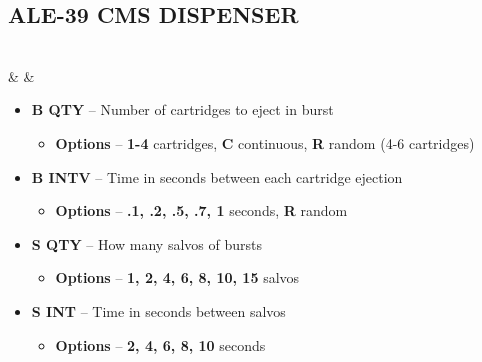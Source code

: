 \documentclass[fontInter]{TechCheck}
\begin{document}
	\subsection{ALE-39 CMS DISPENSER}
	\begin{listlongtable}
		 \\
		\midrule
		\textbf{\textbullet} &  &
		\begin{minipage}[t]{\linewidth}
			\vspace{-7pt}
			\begin{itemize}
				\item \textbf{B QTY} -- Number of cartridges to eject in burst
				\begin{itemize}
					\item \textbf{Options} -- \textbf{1-4} cartridges, \textbf{C} continuous, \textbf{R} random (4-6 cartridges)
				\end{itemize}
				\item \textbf{B INTV} -- Time in seconds between each cartridge ejection
				\begin{itemize}
					\item \textbf{Options} -- \textbf{.1, .2, .5, .7, 1} seconds, \textbf{R} random
				\end{itemize}
				\item \textbf{S QTY} -- How many salvos of bursts
				\begin{itemize}
					\item \textbf{Options} -- \textbf{1, 2, 4, 6, 8, 10, 15} salvos
				\end{itemize}
				\item \textbf{S INT} -- Time in seconds between salvos
				\begin{itemize}
					\item \textbf{Options} -- \textbf{2, 4, 6, 8, 10} seconds
				\end{itemize}
			\end{itemize}
		\end{minipage} \\
	\end{listlongtable}

\end{document}
